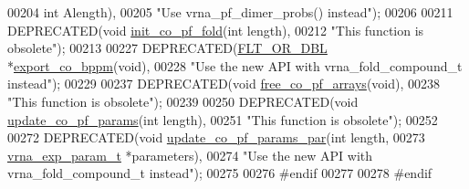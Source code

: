 \begin{DoxyCode}
00204                                       \textcolor{keywordtype}{int}       Alength),
00205 \textcolor{stringliteral}{"Use vrna\_pf\_dimer\_probs() instead"});
00206 
00211 DEPRECATED(\textcolor{keywordtype}{void}   \hyperlink{part__func__co_8h_aa12dda9dd6179cdd22bcce87c0682c07}{init\_co\_pf\_fold}(\textcolor{keywordtype}{int} length),
00212 \textcolor{stringliteral}{"This function is obsolete"});
00213 
00227 DEPRECATED(\hyperlink{group__data__structures_ga31125aeace516926bf7f251f759b6126}{FLT\_OR\_DBL} *\hyperlink{part__func__co_8h_ad94c0133157bed6912fe7fe866e0039e}{export\_co\_bppm}(\textcolor{keywordtype}{void}),
00228 \textcolor{stringliteral}{"Use the new API with vrna\_fold\_compound\_t instead"});
00229 
00237 DEPRECATED(\textcolor{keywordtype}{void} \hyperlink{part__func__co_8h_ade3ce34ae8214811374b1d28a40dc247}{free\_co\_pf\_arrays}(\textcolor{keywordtype}{void}),
00238 \textcolor{stringliteral}{"This function is obsolete"});
00239 
00250 DEPRECATED(\textcolor{keywordtype}{void} \hyperlink{part__func__co_8h_a6e0f36c1f9b7d9dd4bfbad914c1119e5}{update\_co\_pf\_params}(\textcolor{keywordtype}{int} length),
00251 \textcolor{stringliteral}{"This function is obsolete"});
00252 
00272 DEPRECATED(\textcolor{keywordtype}{void} \hyperlink{part__func__co_8h_a75465d7e8793db68a434d83df9a2e794}{update\_co\_pf\_params\_par}(\textcolor{keywordtype}{int}               length,
00273                                         \hyperlink{group__energy__parameters_structvrna__exp__param__s}{vrna\_exp\_param\_t}  *parameters),
00274 \textcolor{stringliteral}{"Use the new API with vrna\_fold\_compound\_t instead"});
00275 
00276 \textcolor{preprocessor}{#endif}
00277 
00278 \textcolor{preprocessor}{#endif}
\end{DoxyCode}
